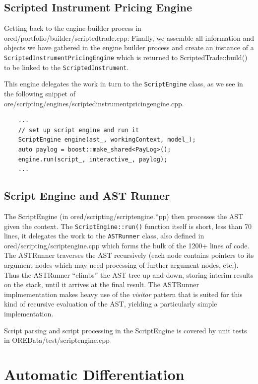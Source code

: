 \documentclass[12pt, a4paper]{report}
\begin{document}
\subsection{Scripted Instrument Pricing Engine}

Getting back to the engine builder process in ored/portfolio/builder/scriptedtrade.cpp:
Finally, we assemble all information and objects we have gathered in the engine builder process and
create an instance of a {\tt ScriptedInstrumentPricingEngine} which is returned to
ScriptedTrade::build() to be linked to the {\tt ScriptedInstrument}.

This engine delegates the work in turn to the {\tt ScriptEngine} class, as we see in the following
snippet of ore/scripting/engines/scriptedinstrumentpricingengine.cpp.

\begin{verbatim}
    ...
    // set up script engine and run it
    ScriptEngine engine(ast_, workingContext, model_);
    auto paylog = boost::make_shared<PayLog>();
    engine.run(script_, interactive_, paylog);
    ...
\end{verbatim}

\subsection{Script Engine and AST Runner}

The ScriptEngine (in ored/scripting/scriptengine.*pp) then processes the AST given the context.
The {\tt ScriptEngine::run()} function itself is short, less than 70 lines, it delegates the work
to the {\tt ASTRunner} class, also defined in ored/scripting/scriptengine.cpp which forms the bulk
of the 1200+ lines of code. The ASTRunner traverses the AST recursively (each node contains pointers
to its argument nodes which may need processing of further argument nodes, etc.). Thus the ASTRunner
``climbs'' the AST tree up and down, storing interim results on the stack, until it arrives at the
final result. The ASTRunner implmementation makes heavy use of the {\em visitor} pattern that
is suited for this kind of recursive evaluation of the AST, yielding a particularly simple
implementation. 

Script parsing and script processing in the ScriptEngine is covered by unit tests in
OREData/test/scriptengine.cpp

\section{Automatic Differentiation}
\label{sec:computationgraph}
\end{document}
